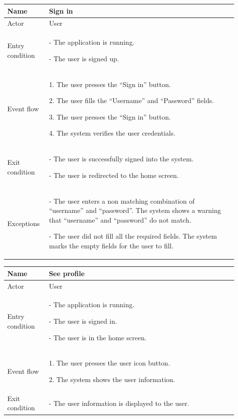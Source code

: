 \begin{table}[H]
\begin{tabular}{|p{0.17\linewidth}|p{0.77\linewidth}|}
\hline
Name            & Sign in
\\ \hline

Actor           & User
\\ \hline

Entry condition &
- The application is running.

- The user is signed up.
\\ \hline
Event flow      & 
    1. The user presses the “Sign in” button.

    2. The user fills the “Username” and “Password” fields.

    3. The user presses the “Sign in” button.
    
    4. The system verifies the user credentials.
\\ \hline
Exit condition  & 
    - The user is successfully signed into the system.

    - The user is redirected to the home screen.
\\ \hline
Exceptions      &
    - The user enters a non matching combination of “username” and “password”. The system shows a warning that “username” and “password” do not match.

    - The user did not fill all the required fields. The system marks the empty fields for the user to fill.
\\ \hline
\end{tabular}
\end{table}

\begin{table}[H]
\begin{tabular}{|p{0.17\linewidth}|p{0.77\linewidth}|}
\hline
Name            & See profile
\\ \hline

Actor           & User
\\ \hline

Entry condition &
- The application is running.

- The user is signed in.

- The user is in the home screen.
\\ \hline
Event flow      & 
    1. The user presses the user icon button.

    2. The system shows the user information.
\\ \hline
Exit condition  & 
    - The user information is displayed to the user.
\\ \hline
\end{tabular}
\end{table}

